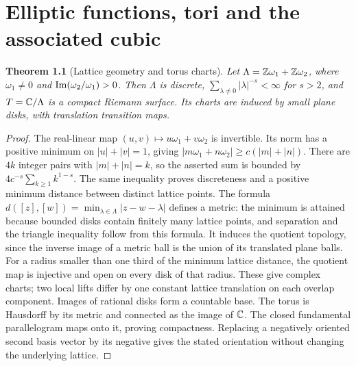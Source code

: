 \documentclass[11pt,a4paper,openany]{book}
\newtheorem{theorem}{Theorem}[chapter]
\theoremstyle{definition}
\theoremstyle{remark}\newtheorem{remark}[theorem]{Remark}
\newcommand{\family}[1]{}
\begin{document}


\chapter{Elliptic functions, tori and the associated cubic}\label{ch:d12-22}

\begin{theorem}[Lattice geometry and torus charts]\label{d12:22-01}\family{D12.22.01}
Let $\Lambda=\mathbb Z\omega_1+\mathbb Z\omega_2$, where $\omega_1\ne0$ and
$\operatorname{Im}(\omega_2/\omega_1)>0$. Then $\Lambda$ is discrete,
$\sum_{\lambda\ne0}|\lambda|^{-s}<\infty$ for $s>2$, and
$T=\mathbb C/\Lambda$ is a compact Riemann surface. Its charts are induced by
small plane disks, with translation transition maps.
\end{theorem}
\begin{proof}
The real-linear map $(u,v)\mapsto u\omega_1+v\omega_2$ is invertible.
Its norm has a positive minimum on $|u|+|v|=1$, giving
$|m\omega_1+n\omega_2|\ge c(|m|+|n|)$. There are $4k$ integer pairs
with $|m|+|n|=k$, so the asserted sum is bounded by
$4c^{-s}\sum_{k\ge1}k^{1-s}$. The same inequality proves discreteness
and a positive minimum distance between distinct lattice points.
The formula
$d([z],[w])=\min_{\lambda\in\Lambda}|z-w-\lambda|$ defines a metric:
the minimum is attained because bounded disks contain finitely many
lattice points, and separation and the triangle inequality follow from
this formula. It induces the quotient topology, since the inverse image
of a metric ball is the union of its translated plane balls. For a
radius smaller than one third of the minimum lattice distance, the
quotient map is injective and open on every disk of that radius. These
give complex charts; two local lifts differ by one constant lattice
translation on each overlap component. Images of rational disks form
a countable base. The torus is Hausdorff by its metric and connected
as the image of $\mathbb C$. The closed fundamental parallelogram maps onto
it, proving compactness. Replacing a negatively oriented second basis
vector by its negative gives the stated orientation without changing
the underlying lattice.
\end{proof}
\end{document}
